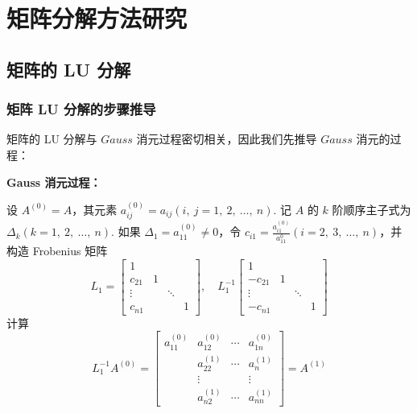 \section{矩阵分解方法研究}
\fontsize{12pt}{14pt}\selectfont
\songti
    \subsection{矩阵的 LU 分解}
        \subsubsection{矩阵 LU 分解的步骤推导}
            \par 矩阵的 LU 分解与 $Gauss$ 消元过程密切相关，因此我们先推导 $Gauss$ 消元的过程：
            \par \textbf{Gauss 消元过程：}
            \par 设 $A^{(0)} = A$，其元素 $a_{ij}^{(0)} = a_{ij}(i, \ j = 1, \ 2, \ \dots, \ n)$. 记 $A$ 的 $k$ 阶顺序主子式为 $\Delta_k(k = 1, \ 2, \ \dots, \ n)$. 如果 $\Delta_1 = a_{11}^{(0)} \ne 0$，令 $c_{i1} = \frac{a_{i1}^{(0)}}{a_{11}^{0}}(i = 2, \ 3, \ \dots, \ n)$，并构造 Frobenius 矩阵
            \begin{equation*}
                L_1 = \begin{bmatrix}
                    1 & & & \\ c_{21} & 1 & & \\ \vdots & & \ddots & \\ c_{n1} & & & 1 
                \end{bmatrix}, \quad L_1^{-1}\begin{bmatrix}
                    1 & & & \\ -c_{21} & 1 & & \\ \vdots & & \ddots & \\ -c_{n1} & & & 1  
                \end{bmatrix}
            \end{equation*}
            计算 
            \begin{equation*}
                L_1^{-1}A^{(0)} = \begin{bmatrix}
                    a_{11}^{(0)} & a_{12}^{(0)} & \cdots & a_{1n}^{(0)} \\ & a_{22}^{(1)} & \cdots & a_{n}^{(1)} \\ & \vdots & & \vdots \\ & a_{n2}^{(1)} & \cdots & a_{nn}^{(1)}
                \end{bmatrix} = A^{(1)}
            \end{equation*}
